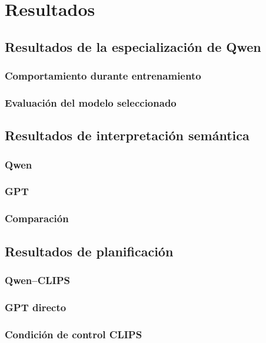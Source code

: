 \chapter{Resultados}

\section{Resultados de la especialización de Qwen}

\subsection{Comportamiento durante entrenamiento}

\subsection{Evaluación del modelo seleccionado}


\section{Resultados de interpretación semántica}

\subsection{Qwen}

\subsection{GPT}

\subsection{Comparación}


\section{Resultados de planificación}

\subsection{Qwen--CLIPS}

\subsection{GPT directo}

\subsection{Condición de control CLIPS}

